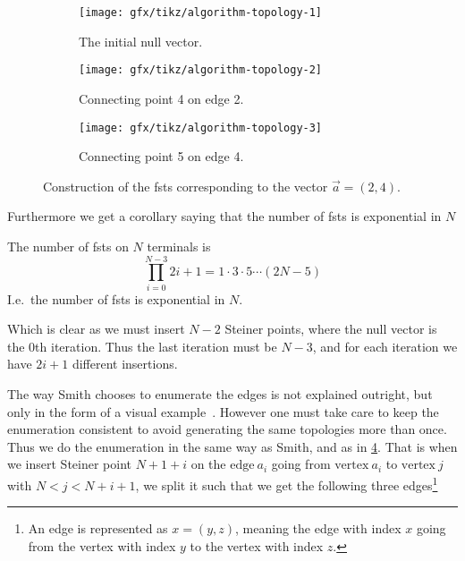 \begin{figure}[htbp] \centering
  \begin{subfigure}[t]{0.3\textwidth}
    \texttt{[image: gfx/tikz/algorithm-topology-1]}
    \caption{The initial null vector.\label{fig:algorithm-topology-1}}
  \end{subfigure} \hfill
  \begin{subfigure}[t]{0.3\textwidth}
    \texttt{[image: gfx/tikz/algorithm-topology-2]}
    \caption{Connecting point 4 on edge 2.\label{fig:algorithm-topology-2}}
  \end{subfigure} \hfill
  \begin{subfigure}[t]{0.3\textwidth}
    \texttt{[image: gfx/tikz/algorithm-topology-3]}
    \caption{Connecting point 5 on edge 4.\label{fig:algorithm-topology-3}}
  \end{subfigure}
  \caption[Construction of FSTs]{Construction of the \glspl{fst} corresponding
to the vector $\vec{a} = (2, 4)$.\label{fig:algorithm-topologies}}
\end{figure}

Furthermore we get a corollary saying that the number of \glspl{fst} is
exponential in $N$

\begin{corollary}
\label{cor:number-of-fsts} The number of \glspl{fst} on $N$ terminals is
\[\prod_{i=0}^{N-3} 2i+1 = 1 \cdot 3 \cdot 5 \cdots (2N - 5)\] I.e.\ the number
of \glspl{fst} is exponential in $N$.
\end{corollary}

Which is clear as we must insert $N-2$ Steiner points, where the null vector is
the $0$th iteration.  Thus the last iteration must be $N-3$, and for each
iteration we have $2i+1$ different insertions.

The way Smith chooses to enumerate the edges is not explained outright, but only
in the form of a visual example~\cite{Smith1992}.  However one must take care to
keep the enumeration consistent to avoid generating the same topologies more
than once.  Thus we do the enumeration in the same way as Smith, and as in
\cref{fig:algorithm-topologies}.  That is when we insert Steiner point $N+1+i$
on the $\text{edge}~a_{i}$ going from $\text{vertex}~a_i$ to $\text{vertex}~j$
with $N < j < N+i+1$, we split it such that we get the following three
edges\footnote{An edge is represented as $x = (y, z)$, meaning the edge with
  index $x$ going from the vertex with index $y$ to the vertex with index
  $z$.}

